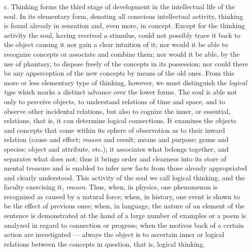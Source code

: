 c. Thinking forms the third stage of development in the intellectual life of the soul. In its elementary form, denoting all conscious intellectual activity, thinking is found
already in sensation and, even more, in concept. Except for the thinking activity the soul, having received a stimulus, could not possibly trace it back to the object causing it nor gain a clear intuition of it; nor would it be able to recognize concepts or associate and combine them; nor would it be able, by the use of phantasy, to dispose freely of the concepts in its possession; nor could there be any apperception of the new concepts by means of the old ones. From this more or less elementary type of thinking, however, we must distinguish the \emph{logical type} which marks a distinct advance over the lower forms. The soul is able not only to perceive objects, to understand relations of time and space, and to observe other incidental relations, but also to cognize the inner, or essential, relations, that is, it can determine logical connections. It examines the objects and concepts that come within its sphere of observation as to their inward relation (cause and effect; \emph{reason} and result; means and purpose; genus and species; object and attribute, etc.); it associates what belongs together, and separates what does not; thus it brings order and clearness into its store of mental treasure and is enabled to infer new facts from those already appropriated and clearly understood. This activity of the soul we call logical thinking, and the faculty exercising it, \emph{reason}. Thus, when, in physics, one phenomenon is recognized as caused by a natural force; when, in history, one event is shown to be the effect of previous ones; when, in language, the nature of an element of the sentence is demonstrated at the hand of a large number of examples or a poem is analyzed in regard to connection or progress; when the motives back of a certain action are investigated — always the object is to ascertain inner or logical relations between the concepts in question, that is, logical thinking.

